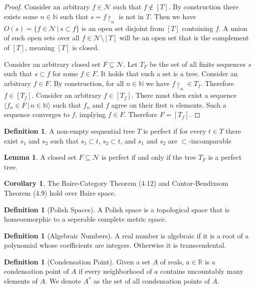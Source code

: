 \documentclass{article}
\theoremstyle{definition}
\newtheorem{crly}[thm]{Corollary}
\newtheorem{defn}[thm]{Definition}
\newtheorem{lmma}[thm]{Lemma}
\newcommand{\N}{\mathbb{N}}
\newcommand{\R}{\mathbb{R}}
\begin{document}
\begin{proof}
    Consider an arbitrary $f \in \mathcal{N}$ such that $f \not\in [T]$. By construction there exists some $n \in \N$ such that $s = f\restriction_n$ is not in $T$. Then we have $O(s) = \{f \in \mathcal{N} \, | \, s \subset f\}$ is an open set disjoint from $[T]$ containing $f$. A union of such open sets over all $f \in \mathcal{N} \setminus [T]$ will be an open set that is the complement of $[T]$, meaning $[T]$ is closed.

    Consider an arbitrary closed set $F \subseteq \mathcal{N}$. Let $T_F$ be the set of all finite sequences $s$ such that $s \subset f$ for some $f \in F$. It holds that such a set is a tree. Consider an arbitrary $f \in F$. By construction, for all $n \in \N$ we have $f \restriction_{n} \in T_f$. Therefore $f \in [T_f]$. Consider an arbitrary $f \in [T_f]$. There must then exist a sequence $\langle f_n \in F \, | \, n \in \N \rangle$ such that $f_n$ and $f$ agree on their first $n$ elements. Such a sequence converges to $f$, implying $f \in F$. Therefore $F = [T_f]$.
\end{proof}

\begin{defn}
    A non-empty sequential tree $T$ is perfect if for every $t \in T$ there exist $s_1$ and $s_2$ such that $s_1 \subset t$, $s_2 \subset t$, and $s_1$ and $s_2$ are $\subset$-incomparable
\end{defn}

\begin{lmma}
    A closed set $F \subseteq \mathcal{N}$ is perfect if and only if the tree $T_F$ is a perfect tree.
\end{lmma}

\begin{crly}
    The Baire-Category Theorem (4.12) and Cantor-Bendixsom Theorem (4.9) hold over Baire space.
\end{crly}

\begin{defn}[Polish Spaces]
    A Polish space is a topological space that is homeoemorphic to a seperable complete metric space. 
\end{defn}

\begin{defn}[Algebraic Numbers]
    A real number is algebraic if it is a root of a polynomial whose coefficients are integers. Otherwise it is transcendental.
\end{defn}

\begin{defn}[Condensation Point]
    Given a set $A$ of reals, $a \in \R$ is a condensation point of $A$ if every neighborhood of $a$ contains uncountably many elements of $A$. We denote $A^*$ as the set of all condensation points of $A$.
\end{defn}
\end{document}
